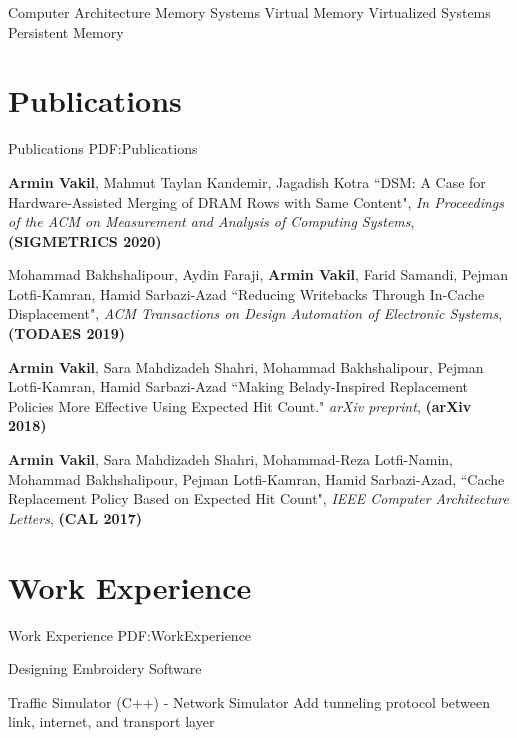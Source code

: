 \documentclass[a4paper,9pt,oneside]{article}
\begin{document}
\begin{body}
\BulletItem
Computer Architecture
\BulletItem
Memory Systems
\BulletItem
Virtual Memory
\BulletItem
Virtualized Systems
\BulletItem
Persistent Memory

\section
{Publications}
{Publications}
{PDF:Publications}

\BulletItem
\textbf{Armin Vakil},
Mahmut Taylan Kandemir,
Jagadish Kotra
``DSM: A Case for Hardware-Assisted Merging of DRAM Rows with Same Content", \textit{In Proceedings of the ACM on Measurement and Analysis of Computing Systems}, \textbf{(SIGMETRICS 2020)}

\BulletItem
Mohammad Bakhshalipour,
Aydin Faraji,
\textbf{Armin Vakil},
Farid Samandi,
Pejman Lotfi-Kamran,
Hamid Sarbazi-Azad
``Reducing Writebacks Through In-Cache Displacement", \textit{ACM Transactions on Design Automation of Electronic Systems}, \textbf{(TODAES 2019)}

\BulletItem
\textbf{Armin Vakil},
Sara Mahdizadeh Shahri,
Mohammad Bakhshalipour,
Pejman Lotfi-Kamran,
Hamid Sarbazi-Azad
``Making Belady-Inspired Replacement Policies More Effective Using Expected Hit Count." \textit{arXiv preprint}, \textbf{(arXiv 2018)}


\BulletItem
\textbf{Armin Vakil},
Sara Mahdizadeh Shahri,
Mohammad-Reza Lotfi-Namin,
Mohammad Bakhshalipour,
Pejman Lotfi-Kamran,
Hamid Sarbazi-Azad,
``Cache Replacement Policy Based on Expected Hit Count", \textit{IEEE Computer Architecture Letters}, \textbf{(CAL 2017)}



\section
{Work\newline
Experience}
{Work Experience}
{PDF:WorkExperience}


\GapNoBreak
\SubBulletItem
Designing Embroidery Software



\GapNoBreak
\SubBulletItem
Traffic Simulator (C++) - Network Simulator
\SubBulletItem
Add tunneling protocol between link, internet, and transport layer


\end{body}
\end{document}
